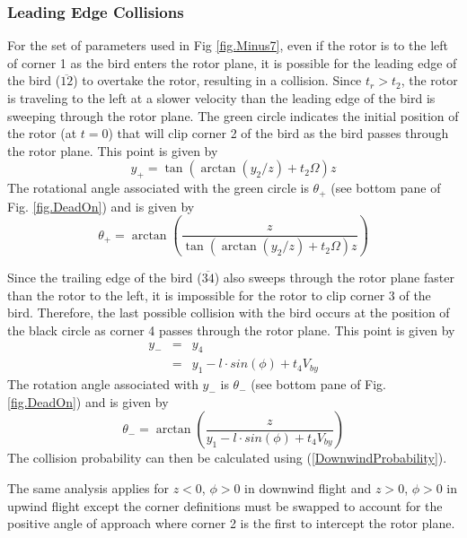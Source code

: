 \documentclass[10pt,conference]{IEEEtran}
\begin{document}
\subsubsection{Leading Edge Collisions}
For the set of parameters used in Fig \ref{fig.Minus7}, even if the rotor is to the left of corner 1 as the bird enters
the rotor plane, it is possible for the leading edge of the bird ($\overline{12}$) to overtake the rotor, resulting in
a collision. Since $t_r>t_2$, the rotor is traveling to the left at a slower velocity than the leading edge of the bird
is sweeping through the rotor plane. The green circle indicates the initial position of the rotor (at $t=0$) that will
clip corner 2 of the bird as the bird passes through the rotor plane. This point is given by
\begin{equation}
    y_+ = \tan(\arctan(y_2/z)+t_2\Omega)z
\end{equation}
The rotational angle associated with the green circle is $\theta_+$ (see bottom pane of Fig. \ref{fig.DeadOn}) and is
given by
\begin{equation}
    \theta_+ = \arctan\left(\frac{z}{\tan(\arctan(y_2/z)+t_2\Omega)z}\right)
\end{equation}

Since the trailing edge of the bird ($\overline{34}$) also sweeps through the rotor plane faster than the rotor to the
left, it is impossible for the rotor to clip corner 3 of the bird. Therefore, the last possible collision with the bird
occurs at the position of the black circle as corner 4 passes through the rotor plane. This point is given by
\begin{eqnarray}
    \nonumber y_- &=& y_4\\
    &=& y_1-l \cdot sin(\phi) + t_4V_{by}
\end{eqnarray}
The rotation angle associated with $y_-$ is $\theta_-$ (see bottom pane of Fig. \ref{fig.DeadOn}) and is given by
\begin{equation}
    \theta_- = \arctan\left(\frac{z}{y_1-l \cdot sin(\phi) + t_4V_{by}}\right)
\end{equation}
The collision probability can then be calculated using (\ref{DownwindProbability}).

The same analysis applies for $z<0$, $\phi>0$ in downwind flight and $z>0$, $\phi>0$ in upwind flight except the corner
definitions must be swapped to account for the positive angle of approach where corner 2 is the first to intercept the
rotor plane.
\end{document}
